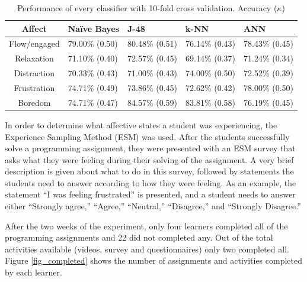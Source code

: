 \documentclass[a4paper,twoside]{article}
\begin{document}


\begin{table}[!t]
\centering
\caption{Performance of every classifier with 10-fold cross validation. Accuracy ($\kappa$) }
\label{tab_performance}
    \begin{tabular}{ | c | l | l | l | l | }
    \hline
    Affect          & Na\"ive Bayes           & J-48                & k-NN              & ANN \\
    \hline
    Flow/engaged    & 79.00\% (0.50) & 80.48\% (0.51) & 76.14\% (0.43) & 78.43\% (0.45) \\
    \hline
    Relaxation      & 71.10\% (0.40) & 72.57\% (0.45) & 69.14\% (0.37) & 71.24\% (0.34)\\
    \hline
    Distraction     & 70.33\% (0.43) & 71.00\% (0.43) & 74.00\% (0.50) & 72.52\% (0.39)\\
    \hline
    Frustration     & 74.71\% (0.49) & 73.86\% (0.45) & 72.62\% (0.42) & 78.00\% (0.50)\\
    \hline
    Boredom         & 74.71\% (0.47) & 84.57\% (0.59) & 83.81\% (0.58) & 76.19\% (0.45)\\
    \hline
    \end{tabular}
\end{table}



In order to determine what affective states a student was experiencing, the
Experience Sampling Method (ESM) \cite{kubey1996experience} was used.
After the students successfully solve a programming assignment, they were presented
with an ESM survey that asks what they were feeling during their solving of the
assignment. A very brief description is given about what to do in this survey,
followed by statements the students need to answer according to how they were
feeling. As an example, the statement “I was feeling frustrated” is presented,
and a student needs to answer either “Strongly agree,” “Agree,” “Neutral,”
“Disagree,” and “Strongly Disagree.”

After the two weeks of the experiment, only four learners completed all of the
programming assignments and 22 did not completed any. Out of the total activities
available (videos, survey and questionnaires) only two completed all. Figure \ref{fig_completed}
shows the number of assignments and activities completed by each learner.
  
\end{document}
